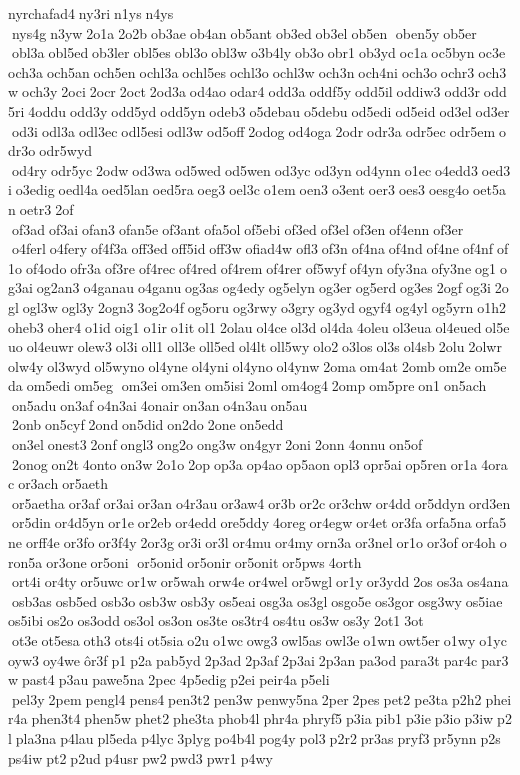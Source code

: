 nyrchafad4 ny3ri n1ys n4ys  nys4g n3yw 2o1a 2o2b ob3ae ob4an ob5ant ob3ed ob3el ob5en  oben5y ob5er  obl3a obl5ed ob3ler obl5es obl3o obl3w o3b4ly ob3o obr1 ob3yd oc1a oc5byn oc3e och3a och5an och5en ochl3a ochl5es ochl3o ochl3w och3n och4ni och3o ochr3 och3w och3y 2oci 2ocr 2oct 2od3a od4ao odar4 odd3a oddf5y odd5il oddiw3 odd3r odd5ri 4oddu odd3y odd5yd odd5yn odeb3 o5debau o5debu od5edi od5eid od3el od3er od3i odl3a odl3ec odl5esi odl3w od5off 2odog od4oga 2odr odr3a odr5ec odr5em odr3o odr5wyd  od4ry odr5yc 2odw od3wa od5wed od5wen od3yc od3yn od4ynn o1ec o4edd3 oed3i o3edig oedl4a oed5lan oed5ra oeg3 oel3c o1em oen3 o3ent oer3 oes3 oesg4o oet5an oetr3 2of  of3ad of3ai ofan3 ofan5e of3ant ofa5ol of5ebi of3ed of3el of3en of4enn of3er  o4ferl o4fery of4f3a off3ed off5id off3w ofiad4w ofl3 of3n of4na of4nd of4ne of4nf of1o of4odo ofr3a of3re of4rec of4red of4rem of4rer of5wyf of4yn ofy3na ofy3ne og1 og3ai og2an3 o4ganau o4ganu og3as og4edy og5elyn og3er og5erd og3es 2ogf og3i 2ogl ogl3w ogl3y 2ogn3 3og2o4f og5oru og3rwy o3gry og3yd ogyf4 og4yl og5yrn o1h2 oheb3 oher4 o1id oig1 o1ir o1it ol1 2olau ol4ce ol3d ol4da 4oleu ol3eua ol4eued ol5euo ol4euwr olew3 ol3i oll1 oll3e oll5ed ol4lt oll5wy olo2 o3los ol3s ol4sb 2olu 2olwr olw4y ol3wyd ol5wyno ol4yne ol4yni ol4yno ol4ynw 2oma om4at 2omb om2e om5eda om5edi om5eg  om3ei om3en om5isi 2oml om4og4 2omp om5pre on1 on5ach  on5adu on3af o4n3ai 4onair on3an o4n3au on5au  2onb on5cyf 2ond on5did on2do 2one on5edd  on3el onest3 2onf ongl3 ong2o ong3w on4gyr 2oni 2onn 4onnu on5of  2onog on2t 4onto on3w 2o1o 2op op3a op4ao op5aon opl3 opr5ai op5ren or1a 4orac or3ach or5aeth  or5aetha or3af or3ai or3an o4r3au or3aw4 or3b or2c or3chw or4dd or5ddyn ord3en or5din or4d5yn or1e or2eb or4edd ore5ddy 4oreg or4egw or4et or3fa orfa5na orfa5ne orff4e or3fo or3f4y 2or3g or3i or3l or4mu or4my orn3a or3nel or1o or3of or4oh oron5a or3one or5oni  or5onid or5onir or5onit or5pws 4orth  ort4i or4ty or5uwc or1w or5wah orw4e or4wel or5wgl or1y or3ydd 2os os3a os4ana osb3as osb5ed osb3o osb3w osb3y os5eai osg3a os3gl osgo5e os3gor osg3wy os5iae os5ibi os2o os3odd os3ol os3on os3te os3tr4 os4tu os3w os3y 2ot1 3ot  ot3e ot5esa oth3 ots4i ot5sia o2u o1wc owg3 owl5as owl3e o1wn owt5er o1wy o1yc oyw3 oy4we ôr3f p1 p2a pab5yd 2p3ad 2p3af 2p3ai 2p3an pa3od para3t par4c par3w past4 p3au pawe5na 2pec 4p5edig p2ei peir4a p5eli  pel3y 2pem pengl4 pens4 pen3t2 pen3w penwy5na 2per 2pes pet2 pe3ta p2h2 pheir4a phen3t4 phen5w phet2 phe3ta phob4l phr4a phryf5 p3ia pib1 p3ie p3io p3iw p2l pla3na p4lau pl5eda p4lyc 3plyg po4b4l pog4y pol3 p2r2 pr3as pryf3 pr5ynn p2s ps4iw pt2 p2ud p4usr pw2 pwd3 pwr1 p4wy 